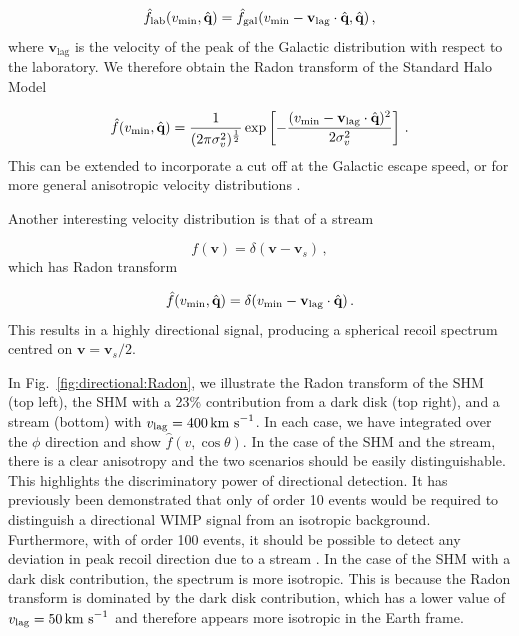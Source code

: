 \begin{equation}
\hat{f}_\textrm{lab}(\vmin, \hat{\textbf{q}}) = \hat{f}_\textrm{gal}(\vmin - \textbf{v}_\textrm{lag}\cdot\hat{\textbf{q}} , \hat{\textbf{q}})\,,
\end{equation}
where $\textbf{v}_\textrm{lag}$ is the velocity of the peak of the Galactic distribution with respect to the laboratory. We therefore obtain the Radon transform of the Standard Halo Model

\begin{equation}
\label{eq:directional:SHM}
\hat{f}(\vmin,\hat{\textbf{q}}) =  \frac{1}{(2\pi \sigma_v^2)^{\frac{1}{2}}} \exp \left[ -\frac{(\vmin - \textbf{v}_\textrm{lag}\cdot\hat{\textbf{q}})^2}{2 \sigma_v^2}\right]\,.
\end{equation}
This can be extended to incorporate a cut off at the Galactic escape speed, or for more general anisotropic velocity distributions \cite{Gondolo:2002}.

Another interesting velocity distribution is that of a stream

\begin{equation}
f(\textbf{v}) = \delta(\textbf{v} - \textbf{v}_s)\,,
\end{equation}
which has Radon transform

\begin{equation}
\hat{f}(\vmin,\hat{\textbf{q}}) =  \delta(\vmin - \textbf{v}_\textrm{lag}\cdot\hat{\textbf{q}})\,.
\end{equation}
This results in a highly directional signal, producing a spherical recoil spectrum centred on $\textbf{v} = \textbf{v}_s/2$.


In Fig.~\ref{fig:directional:Radon}, we illustrate the Radon transform of the SHM (top left), the SHM with a 23\% contribution from a dark disk (top right), and a stream (bottom) with $v_\textrm{lag} = 400 \,\textrm{km s}^{-1}$. In each case, we have integrated over the $\phi$ direction and show $\hat{f}(v, \cos\theta)$. In the case of the SHM and the stream, there is a clear anisotropy and the two scenarios should be easily distinguishable. This highlights the discriminatory power of directional detection. It has previously been demonstrated that only of order 10 events would be required to distinguish a directional WIMP signal from an isotropic background. Furthermore, with of order 100 events, it should be possible to detect any deviation in peak recoil direction due to a stream \cite{Morgan:2005}. In the case of the SHM with a dark disk contribution, the spectrum is more isotropic. This is because the Radon transform is dominated by the dark disk contribution, which has a lower value of $v_\textrm{lag} = 50 \,\textrm{km s}^{-1}$ and therefore appears more isotropic in the Earth frame. 

